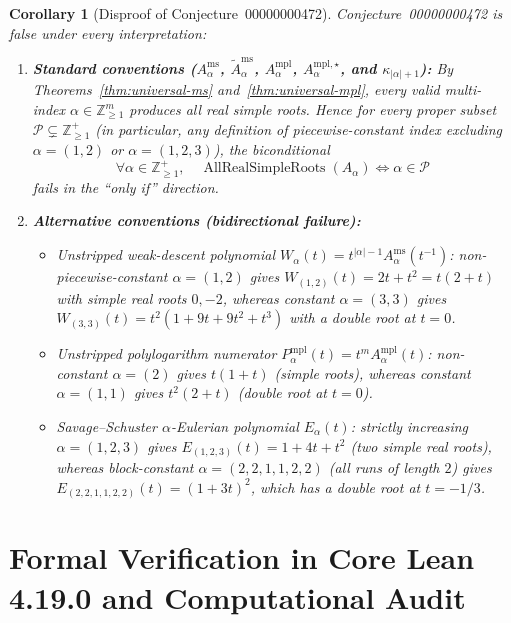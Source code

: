 \documentclass[11pt]{article}
\newtheorem{corollary}[theorem]{Corollary}
\theoremstyle{definition}
\newcommand{\ZZ}{\mathbb{Z}}
\begin{document}
\begin{corollary}[Disproof of Conjecture~00000000472]\label{cor:disproof}
Conjecture~00000000472 is false under every interpretation:
\begin{enumerate}
  \item \textbf{Standard conventions ($A_\alpha^{\mathrm{ms}}$, $\tilde{A}_\alpha^{\mathrm{ms}}$,
  $A_\alpha^{\mathrm{mpl}}$, $A_\alpha^{\mathrm{mpl},\star}$, and $\kappa_{|\alpha|+1}$):}
  By Theorems~\ref{thm:universal-ms} and~\ref{thm:universal-mpl}, \emph{every} valid
  multi-index $\alpha \in \ZZ_{\ge 1}^m$ produces all real simple roots. Hence for \emph{every}
  proper subset $\mathcal{P} \subsetneq \ZZ_{\ge 1}^+$ (in particular, any definition of
  piecewise-constant index excluding $\alpha=(1,2)$ or $\alpha=(1,2,3)$), the biconditional
  \[
    \forall \alpha \in \ZZ_{\ge 1}^+,\quad
    \operatorname{AllRealSimpleRoots}(A_\alpha) \Longleftrightarrow \alpha \in \mathcal{P}
  \]
  fails in the ``only if'' direction.
  \item \textbf{Alternative conventions (bidirectional failure):}
  \begin{itemize}
    \item \emph{Unstripped weak-descent polynomial} $W_\alpha(t) = t^{|\alpha|-1}
    A_\alpha^{\mathrm{ms}}(t^{-1})$: non-piecewise-constant $\alpha=(1,2)$ gives
    $W_{(1,2)}(t) = 2t + t^2 = t(2+t)$ with simple real roots $0,-2$, whereas constant
    $\alpha=(3,3)$ gives $W_{(3,3)}(t) = t^2(1 + 9t + 9t^2 + t^3)$ with a double root at $t=0$.
    \item \emph{Unstripped polylogarithm numerator} $P_\alpha^{\mathrm{mpl}}(t) =
    t^m A_\alpha^{\mathrm{mpl}}(t)$: non-constant $\alpha=(2)$ gives $t(1+t)$ (simple roots),
    whereas constant $\alpha=(1,1)$ gives $t^2(2+t)$ (double root at $t=0$).
    \item \emph{Savage--Schuster $\alpha$-Eulerian polynomial} $E_\alpha(t)$: strictly
    increasing $\alpha=(1,2,3)$ gives $E_{(1,2,3)}(t) = 1 + 4t + t^2$ (two simple real roots),
    whereas block-constant $\alpha=(2,2,1,1,2,2)$ (all runs of length $2$) gives
    $E_{(2,2,1,1,2,2)}(t) = (1 + 3t)^2$, which has a double root at $t = -1/3$.
  \end{itemize}
\end{enumerate}
\end{corollary}

\section{Formal Verification in Core Lean 4.19.0 and Computational Audit}
\end{document}
